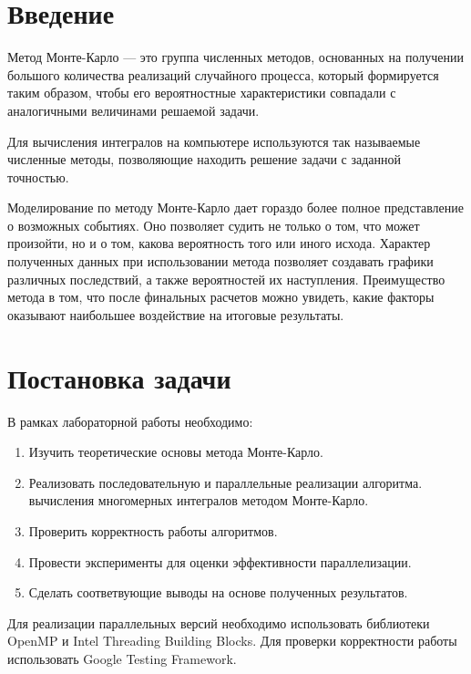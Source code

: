 \documentclass{report}
\begin{document}
\setcounter{page}{2}

\tableofcontents
\newpage

\section*{Введение}
Метод Монте-Карло — это группа численных методов, основанных на
получении большого количества реализаций случайного процесса, который
формируется таким образом, чтобы его вероятностные характеристики
совпадали с аналогичными величинами решаемой задачи.
\par Для вычисления интегралов на компьютере используются так называемые численные методы, позволяющие находить решение задачи с заданной точностью.
\par Моделирование по методу Монте-Карло дает гораздо более полное
представление о возможных событиях. Оно позволяет судить не только о том,
что может произойти, но и о том, какова вероятность того или иного исхода.
Характер полученных данных при использовании метода позволяет создавать
графики различных последствий, а также вероятностей их наступления.
Преимущество метода в том, что после финальных расчетов можно
увидеть, какие факторы оказывают наибольшее воздействие на итоговые
результаты.

\newpage

\section*{Постановка задачи}
В рамках лабораторной работы необходимо:
\begin{enumerate}
\item Изучить теоретические основы метода Монте-Карло.
\item Реализовать последовательную и параллельные реализации алгоритма. вычисления многомерных интегралов методом Монте-Карло.
\item Проверить корректность работы алгоритмов.
\item Провести эксперименты для оценки эффективности параллелизации.
\item Сделать соответвующие выводы на основе полученных результатов.
\end{enumerate}
\par Для реализации параллельных версий необходимо использовать библиотеки OpenMP и Intel Threading Building Blocks. Для проверки корректности работы использовать Google Testing Framework.
\newpage
\end{document}

